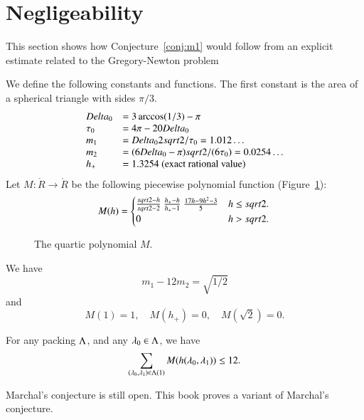 \section{Negligeability}

This section shows how Conjecture~\ref{conj:m1} would follow from an explicit estimate
related to the Gregory-Newton problem


We define the following constants and functions.  The first constant
is the area of a spherical triangle with sides $\pi/3$.
$$
\begin{array}{lll}
\Delta_0 &= 3\arccos(1/3)-\pi\\
\tau_0 &= 4\pi - 20\Delta_0\\
m_1 &= \Delta_0 2\sqrt2/\tau_0 = 1.012\ldots \\ %
m_2  &= (6\Delta_0- \pi)\sqrt2/(6 \tau_0) = 0.0254\ldots\\ %
h_+ &= 1.3254 \hbox{~(exact rational value)}
\end{array}
$$
Let $M:\ring{R}\to\ring{R}$ 
be the following piecewise polynomial function (Figure~\ref{fig:M}):
$$
M(h) =
\begin{cases}
\frac{\sqrt2-h}{\sqrt2-2}~ \frac{h_+-h}{h_+-1} ~\frac{17 h - 9 h^2 - 3}{5} & h \le \sqrt2. \\
 0 & h >\sqrt2.
\end{cases}
\\
$$
\begin{figure}[htb]
  \centering
  \caption{The quartic polynomial $M$.}
  \label{fig:M}
\end{figure}

We have 
\begin{equation}\label{eqn:km}m_1 - 12m_2 = \sqrt{1/2}\end{equation}
and
\begin{equation}M(1) = 1,\quad M(h_+)=0,\quad M(\sqrt2) =0.\end{equation}


\begin{conjecture}[Marchal]\label{conj:m1} For any packing $\Lam$, and
any $\lam_0\in\Lam$, we have
$$
\sum_{(\lam_0,\lam_1)\in\Lam(1)} M(h(\lam_0,\lam_1)) \le 12.
$$
\end{conjecture}

Marchal's conjecture is still open.  This book proves a variant of Marchal's conjecture.

